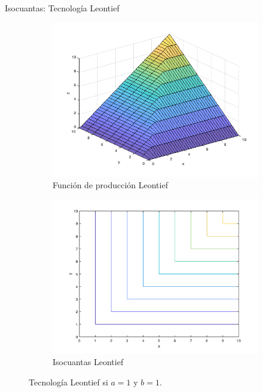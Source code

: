 \documentclass{beamer}
\theoremstyle{definition}
\begin{document}
\begin{frame}{Isocuantas: Tecnología Leontief}

\begin{figure}
\centering
\begin{subfigure}{.5\textwidth}
  \centering
  \includegraphics[width=1\linewidth]{figures2/complements3d.png}
  \caption{Función de producción Leontief}
  \label{fig:sub1L}
\end{subfigure}%
\begin{subfigure}{.5\textwidth}
  \centering
  \includegraphics[width=1\linewidth]{figures2/complementslevel.png}
  \caption{Isocuantas Leontief}
  \label{fig:sub2L}
\end{subfigure}
\caption{Tecnología Leontief si $a=1$ y $b=1$.}
\label{fig:testL}
\end{figure}


\end{frame}
\end{document}
